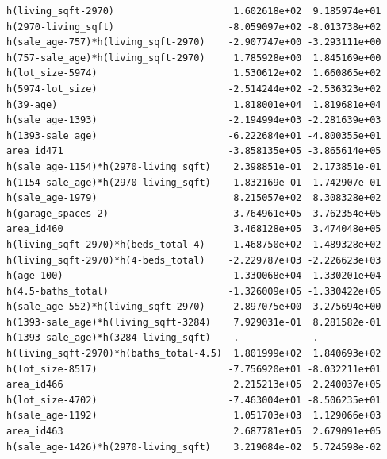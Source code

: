 \documentclass[
]{article}
\begin{document}
\begin{verbatim}
h(living_sqft-2970)                     1.602618e+02  9.185974e+01
h(2970-living_sqft)                    -8.059097e+02 -8.013738e+02
h(sale_age-757)*h(living_sqft-2970)    -2.907747e+00 -3.293111e+00
h(757-sale_age)*h(living_sqft-2970)     1.785928e+00  1.845169e+00
h(lot_size-5974)                        1.530612e+02  1.660865e+02
h(5974-lot_size)                       -2.514244e+02 -2.536323e+02
h(39-age)                               1.818001e+04  1.819681e+04
h(sale_age-1393)                       -2.194994e+03 -2.281639e+03
h(1393-sale_age)                       -6.222684e+01 -4.800355e+01
area_id471                             -3.858135e+05 -3.865614e+05
h(sale_age-1154)*h(2970-living_sqft)    2.398851e-01  2.173851e-01
h(1154-sale_age)*h(2970-living_sqft)    1.832169e-01  1.742907e-01
h(sale_age-1979)                        8.215057e+02  8.308328e+02
h(garage_spaces-2)                     -3.764961e+05 -3.762354e+05
area_id460                              3.468128e+05  3.474048e+05
h(living_sqft-2970)*h(beds_total-4)    -1.468750e+02 -1.489328e+02
h(living_sqft-2970)*h(4-beds_total)    -2.229787e+03 -2.226623e+03
h(age-100)                             -1.330068e+04 -1.330201e+04
h(4.5-baths_total)                     -1.326009e+05 -1.330422e+05
h(sale_age-552)*h(living_sqft-2970)     2.897075e+00  3.275694e+00
h(1393-sale_age)*h(living_sqft-3284)    7.929031e-01  8.281582e-01
h(1393-sale_age)*h(3284-living_sqft)    .             .           
h(living_sqft-2970)*h(baths_total-4.5)  1.801999e+02  1.840693e+02
h(lot_size-8517)                       -7.756920e+01 -8.032211e+01
area_id466                              2.215213e+05  2.240037e+05
h(lot_size-4702)                       -7.463004e+01 -8.506235e+01
h(sale_age-1192)                        1.051703e+03  1.129066e+03
area_id463                              2.687781e+05  2.679091e+05
h(sale_age-1426)*h(2970-living_sqft)    3.219084e-02  5.724598e-02
                                                                  

\end{verbatim}
\end{document}
